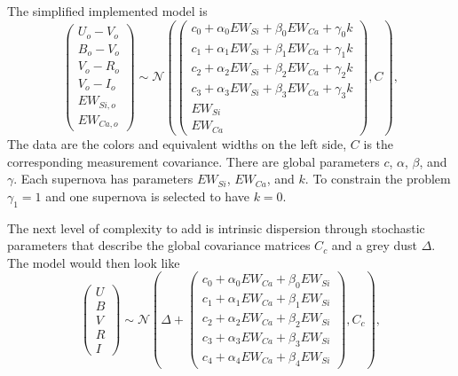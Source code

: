 \documentclass[11pt, oneside]{article}   	%
\begin{document}
The simplified implemented model is
\begin{equation}
\left(
\begin{matrix}
U_o-V_o\\B_o-V_o\\V_o-R_o\\V_o-I_o\\EW_{Si, o}\\ EW_{Ca, o}
\end{matrix}
\right) \sim \mathcal{N}
\left(
\left(
\begin{matrix}
c_0+\alpha_0 EW_{Si} + \beta_0 EW_{Ca} +\gamma_0 k  \\
c_1+\alpha_1 EW_{Si} + \beta_1 EW_{Ca}  +\gamma_1 k  \\
c_2+\alpha_2 EW_{Si} + \beta_2 EW_{Ca} +\gamma_2 k\\
c_3+\alpha_3 EW_{Si} + \beta_3 EW_{Ca} +\gamma_3 k\\
EW_{Si}\\ EW_{Ca}
\end{matrix}
\right)
,C
\right),
\end{equation}
The data are the colors and equivalent widths on the left side, $C$ is the corresponding measurement
covariance.  There are global parameters $c$, $\alpha$, $\beta$, and $\gamma$.  Each
supernova has parameters $EW_{Si}$, $EW_{Ca}$, and $k$.  To constrain the problem $\gamma_1=1$ and one supernova is selected to have
$k=0$.

The next level of complexity to add is intrinsic dispersion through stochastic parameters that describe the global  covariance matrices
$C_{c}$ and a grey dust $\Delta$.  The model would then look like
\begin{equation*}
\left(
\begin{matrix}
U\\B\\V\\R\\I
\end{matrix}
\right) \sim \mathcal{N}
\left(
\Delta +
\left(
\begin{matrix}
c_0+\alpha_0 EW_{Ca} + \beta_0 EW_{Si} \\
c_1+\alpha_1 EW_{Ca} + \beta_1 EW_{Si}  \\
c_2+\alpha_2 EW_{Ca} + \beta_2 EW_{Si} \\
c_3+\alpha_3 EW_{Ca} + \beta_3 EW_{Si} \\
c_4+\alpha_4 EW_{Ca} + \beta_4 EW_{Si}
\end{matrix}
\right)
,C_{c}
\right),
\end{equation*}
\end{document}
